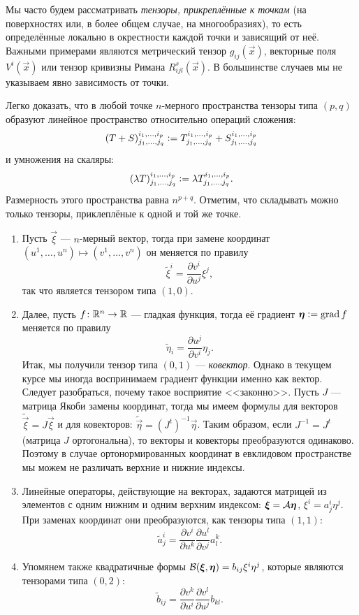 Мы часто будем рассматривать \textit{тензоры, прикреплённые к точкам} (на поверхностях или, в более общем случае, на многообразиях), то есть определённые локально в окрестности каждой точки и зависящий от неё. Важными примерами являются метрический тензор $g_{ij}(\vec{x})$, векторные поля $V^i(\vec{x})$ или тензор кривизны Римана $R^s_{ijl}(\vec{x})$. В большинстве случаев мы не указываем явно зависимость от точки.

Легко доказать, что в любой точке $n$-мерного пространства тензоры типа $(p, q)$ образуют линейное пространство относительно операций сложения:
\[
	(T + S)^{i_1, \ldots, i_p}_{j_1, \ldots, j_q} \vcentcolon = T^{i_1, \ldots, i_p}_{j_1, \ldots, j_q} + S^{i_1, \ldots, i_p}_{j_1, \ldots, j_q}
\]
и умножения на скаляры:
\[
	(\lambda T)^{i_1, \ldots, i_p}_{j_1, \ldots, j_q} \vcentcolon = \lambda T^{i_1, \ldots, i_p}_{j_1, \ldots, j_q}.
\]
Размерность этого пространства равна $n^{p + q}$. Отметим, что складывать можно только тензоры, приклеплёные к одной и той же точке.

\begin{example}
	\begin{enumerate}[nolistsep, label=(\arabic*)]
		\item Пусть $\vec{\xi}$ --- $n$-мерный вектор, тогда при замене координат $(u^1, \ldots, u^n) \mapsto (v^1, \ldots, v^n)$ он меняется по правилу
			\[
				\widetilde{\xi}^i = \frac{\partial v^i}{\partial u^j}\xi^j,
			\]
			так что является тензором типа $(1, 0)$.
		\item Далее, пусть $f\colon \mathbb{R}^n \to \mathbb{R}$ --- гладкая функция, тогда её градиент $\boldsymbol{\eta} \vcentcolon = \operatorname{grad} f$ меняется по правилу
			\[
				\widetilde{\eta}_i = \frac{\partial u^j}{\partial v^i}\eta_j.
			\]
			Итак, мы получили тензор типа $(0, 1)$ --- \textit{ковектор}. Однако в текущем курсе мы иногда воспринимаем градиент функции именно как вектор. Следует разобраться, почему такое восприятие <<законно>>. Пусть $J$ --- матрица Якоби замены координат, тогда мы имеем формулы для векторов $\widetilde{\vec{\xi}} = J\vec{\xi}$ и для ковекторов: $\widetilde{\vec{\eta}} = (J^t)^{-1}\vec{\eta}$. Таким образом, если $J^{-1} = J^t$ (матрица $J$ ортогональна), то векторы и ковекторы преобразуются одинаково. Поэтому в случае ортонормированных координат в евклидовом пространстве мы можем не различать верхние и нижние индексы.
		\item Линейные операторы, действующие на векторах, задаются матрицей из элементов с одним нижним и одним верхним индексом: $\boldsymbol{\xi} = \mathcal{A}\boldsymbol{\eta}$, $\xi^i = a^i_j\eta^j$. При заменах координат они преобразуются, как тензоры типа $(1, 1)$:
			\[
				\widetilde{a}^i_j = \frac{\partial v^i}{\partial u^k}\frac{\partial u^l}{\partial v^j}a^k_l.
			\]
		\item Упомянем также квадратичные формы $\mathcal{B}(\boldsymbol{\xi}, \boldsymbol{\eta}) = b_{ij}\xi^i\eta^j$, которые являются тензорами типа $(0, 2)$:
			\[
				\widetilde{b}_{ij} = \frac{\partial v^k}{\partial u^i}\frac{\partial v^l}{\partial u^j}b_{kl}.
			\]
	\end{enumerate}
\end{example}

